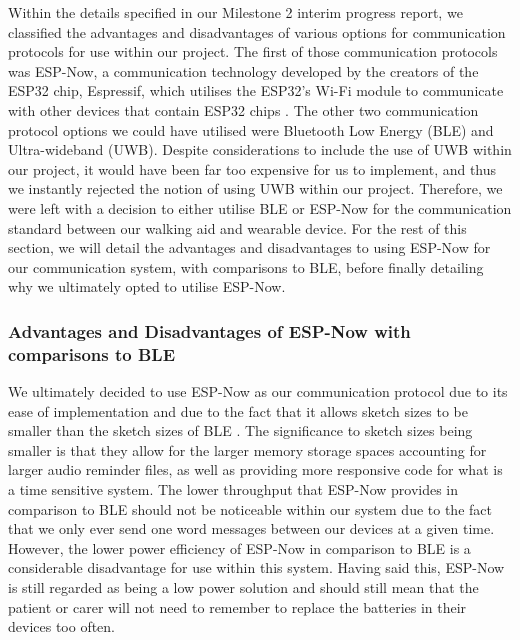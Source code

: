             Within the details specified in our Milestone 2 interim progress report, we classified the advantages and disadvantages of various options for communication protocols for use within our project. The first of those communication protocols was ESP-Now, a communication technology developed by the creators of the ESP32 chip, Espressif, which utilises the ESP32's Wi-Fi module to communicate with other devices that contain ESP32 chips \cite{esp-now_overview}. The other two communication protocol options we could have utilised were Bluetooth Low Energy (BLE) and Ultra-wideband (UWB). Despite considerations to include the use of UWB within our project, it would have been far too expensive for us to implement, and thus we instantly rejected the notion of using UWB within our project. Therefore, we were left with a decision to either utilise BLE or ESP-Now for the communication standard between our walking aid and wearable device. For the rest of this section, we will detail the advantages and disadvantages to using ESP-Now for our communication system, with comparisons to BLE, before finally detailing why we ultimately opted to utilise ESP-Now.

            \newpage
            \subsubsection{Advantages and Disadvantages of ESP-Now with comparisons to BLE}
            \label{subsubsec:esp_now_advantages_disadvantages}

                \vspace{2em}
                
                \vspace{5em}

                We ultimately decided to use ESP-Now as our communication protocol due to its ease of implementation and due to the fact that it allows sketch sizes to be smaller \cite{random_nerd_tutorials} than the sketch sizes of BLE \cite{kolban_2018}. The significance to sketch sizes being smaller is that they allow for the larger memory storage spaces accounting for larger audio reminder files, as well as providing more responsive code for what is a time sensitive system. The lower throughput that ESP-Now provides in comparison to BLE should not be noticeable within our system due to the fact that we only ever send one word messages between our devices at a given time. However, the lower power efficiency of ESP-Now in comparison to BLE is a considerable disadvantage for use within this system. Having said this, ESP-Now is still regarded as being a low power solution and should still mean that the patient or carer will not need to remember to replace the batteries in their devices too often.

